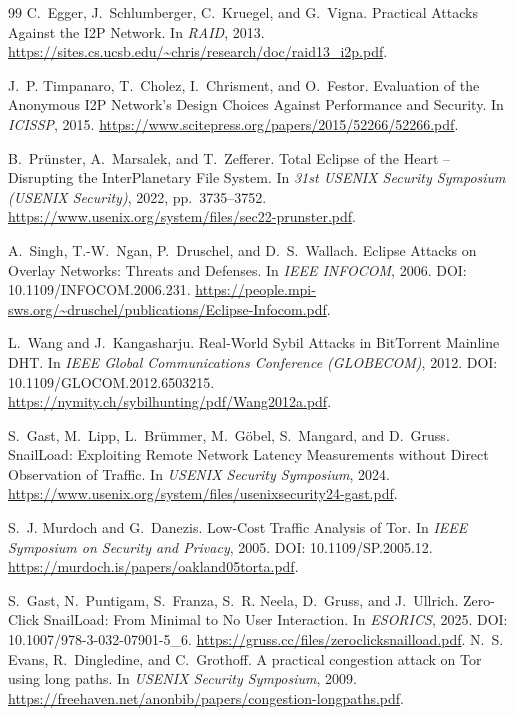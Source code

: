 \documentclass[11pt]{article}
\theoremstyle{definition}
\theoremstyle{remark}
\begin{document}
\begin{thebibliography}{99}
C.~Egger, J.~Schlumberger, C.~Kruegel, and G.~Vigna.
\newblock Practical Attacks Against the I2P Network.
\newblock In \emph{RAID}, 2013.
\newblock \url{https://sites.cs.ucsb.edu/~chris/research/doc/raid13_i2p.pdf}.

J.~P. Timpanaro, T.~Cholez, I.~Chrisment, and O.~Festor.
\newblock Evaluation of the Anonymous I2P Network's Design Choices Against Performance and Security.
\newblock In \emph{ICISSP}, 2015.
\newblock \url{https://www.scitepress.org/papers/2015/52266/52266.pdf}.

B.~Pr\"unster, A.~Marsalek, and T.~Zefferer.
\newblock Total Eclipse of the Heart -- Disrupting the InterPlanetary File System.
\newblock In \emph{31st USENIX Security Symposium (USENIX Security)}, 2022, pp.~3735--3752.
\newblock \url{https://www.usenix.org/system/files/sec22-prunster.pdf}.

A.~Singh, T.-W.~Ngan, P.~Druschel, and D.~S.~Wallach.
\newblock Eclipse Attacks on Overlay Networks: Threats and Defenses.
\newblock In \emph{IEEE INFOCOM}, 2006.
\newblock DOI: 10.1109/INFOCOM.2006.231.
\newblock \url{https://people.mpi-sws.org/~druschel/publications/Eclipse-Infocom.pdf}.

L.~Wang and J.~Kangasharju.
\newblock Real-World Sybil Attacks in BitTorrent Mainline DHT.
\newblock In \emph{IEEE Global Communications Conference (GLOBECOM)}, 2012.
\newblock DOI: 10.1109/GLOCOM.2012.6503215.
\newblock \url{https://nymity.ch/sybilhunting/pdf/Wang2012a.pdf}.

S.~Gast, M.~Lipp, L.~Br\"ummer, M.~G\"obel, S.~Mangard, and D.~Gruss.
\newblock SnailLoad: Exploiting Remote Network Latency Measurements without Direct Observation of Traffic.
\newblock In \emph{USENIX Security Symposium}, 2024.
\newblock \url{https://www.usenix.org/system/files/usenixsecurity24-gast.pdf}.

S.~J. Murdoch and G.~Danezis.
\newblock Low-Cost Traffic Analysis of Tor.
\newblock In \emph{IEEE Symposium on Security and Privacy}, 2005.
\newblock DOI: 10.1109/SP.2005.12.
\newblock \url{https://murdoch.is/papers/oakland05torta.pdf}.


S.~Gast, N.~Puntigam, S.~Franza, S.~R. Neela, D.~Gruss, and J.~Ullrich.
\newblock Zero-Click SnailLoad: From Minimal to No User Interaction.
\newblock In \emph{ESORICS}, 2025.
\newblock DOI: 10.1007/978-3-032-07901-5\_6.
\newblock \url{https://gruss.cc/files/zeroclicksnailload.pdf}.
N.~S. Evans, R.~Dingledine, and C.~Grothoff.
\newblock A practical congestion attack on Tor using long paths.
\newblock In \emph{USENIX Security Symposium}, 2009.
\newblock \url{https://freehaven.net/anonbib/papers/congestion-longpaths.pdf}.


\end{thebibliography}
\end{document}
